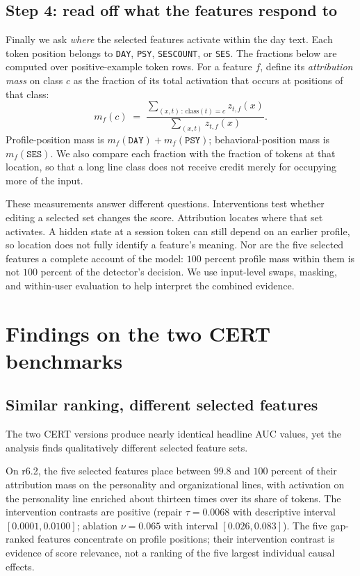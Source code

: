 \documentclass[10pt]{article} %
\begin{document}
\subsection{Step 4: read off what the features respond to}

Finally we ask \emph{where} the selected features activate within the
day text. Each token position belongs to \texttt{DAY}, \texttt{PSY},
\texttt{SESCOUNT}, or \texttt{SES}. The fractions below are computed
over positive-example token rows. For a feature $f$, define its
\emph{attribution mass} on class $c$ as the fraction of its total
activation that occurs at positions of that class:
\begin{equation}
m_f(c) \;=\;
\frac{\sum_{(x,t)\,:\, \mathrm{class}(t) = c} z_{t,f}(x)}
     {\sum_{(x,t)} z_{t,f}(x)} .
\end{equation}
Profile-position mass is $m_f(\texttt{DAY})+m_f(\texttt{PSY})$;
behavioral-position mass is $m_f(\texttt{SES})$. We also compare each
fraction with the fraction of tokens at that location, so that a long
line class does not receive credit merely for occupying more of the input.

These measurements answer different questions. Interventions test whether
editing a selected set changes the score. Attribution locates where that
set activates. A hidden state at a session token can still depend on
an earlier profile, so location does not fully identify a feature's
meaning. Nor are the five selected features a complete account of the
model: $100$ percent profile mass within them is not $100$ percent of
the detector's decision. We use input-level swaps, masking, and
within-user evaluation to help interpret the combined evidence.

\section{Findings on the two CERT benchmarks}
\label{sec:findings}

\subsection{Similar ranking, different selected features}

The two CERT versions produce nearly identical headline AUC values, yet
the analysis finds qualitatively different selected feature sets.

On r6.2, the five selected features place between $99.8$ and $100$
percent of their attribution mass on the personality and organizational
lines, with activation on the personality line enriched about thirteen
times over its share of tokens. The intervention contrasts are positive
(repair $\tau = 0.0068$ with descriptive interval $[0.0001, 0.0100]$;
ablation $\nu = 0.065$ with interval $[0.026, 0.083]$). The five gap-ranked features concentrate on profile positions; their
intervention contrast is evidence of score relevance, not a ranking of
the five largest individual causal effects.
\end{document}
